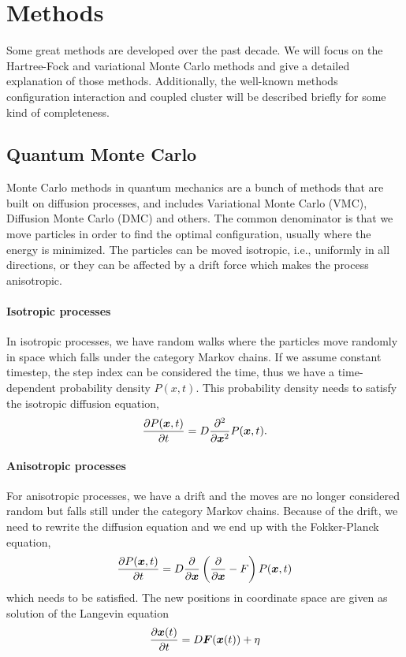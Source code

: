 \chapter{Methods} \label{sec:methods}
Some great methods are developed over the past decade. We will focus on the Hartree-Fock and variational Monte Carlo methods and give a detailed explanation of those methods. Additionally, the well-known methods configuration interaction and coupled cluster will be described briefly for some kind of completeness. 

\section{Quantum Monte Carlo} \label{sec:qmc}
Monte Carlo methods in quantum mechanics are a bunch of methods that are built on diffusion processes, and includes Variational Monte Carlo (VMC), Diffusion Monte Carlo (DMC) and others. The common denominator is that we move particles in order to find the optimal configuration, usually where the energy is minimized. The particles can be moved isotropic, i.e., uniformly in all directions, or they can be affected by a drift force which makes the process anisotropic. 

\subsubsection{Isotropic processes}
In isotropic processes, we have random walks where the particles move randomly in space which falls under the category Markov chains. If we assume constant timestep, the step index can be considered the time, thus we have a time-dependent probability density $P(x,t)$. This probability density needs to satisfy the isotropic diffusion equation,
\begin{equation}
\frac{\partial P(\boldsymbol{{x}},t)}{\partial t}=D\frac{\partial^2}{\partial \boldsymbol{{x}}^2}P(\boldsymbol{{x}},t).
\end{equation}

\subsubsection{Anisotropic processes}
For anisotropic processes, we have a drift and the moves are no longer considered random but falls still under the category Markov chains. Because of the drift, we need to rewrite the diffusion equation and we end up with the Fokker-Planck equation,
\begin{equation}
\frac{\partial P(\boldsymbol{{x}},t)}{\partial t}=D\frac{\partial}{\partial \boldsymbol{{x}}}\left(\frac{\partial}{\partial \boldsymbol{{x}}}-F\right)P(\boldsymbol{{x}},t)
\end{equation}
which needs to be satisfied. The new positions in coordinate space are given as solution of the Langevin equation 
\begin{equation}
\frac{\partial \boldsymbol{{x}}(t)}{\partial t}=D\boldsymbol{{F}}(\boldsymbol{{x}}(t))+\eta
\end{equation}

